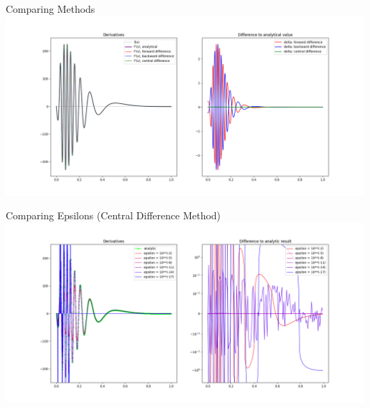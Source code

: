 \begin{frame}{Comparing Methods}
%
\includegraphics[width=\linewidth]{./gfx/03-derivative-methods}
%
\end{frame}


\begin{frame}{Comparing Epsilons (Central Difference Method)}
%
\includegraphics[width=\linewidth]{./gfx/03-derivative-epsilons}
%
\end{frame}


